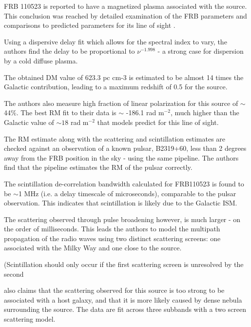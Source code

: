 \documentclass[a4paper,fleqn,usenatbib]{mnras}
\begin{document}
FRB 110523 is reported to have a magnetized plasma associated with the source. This conclusion was reached by detailed examination of the FRB parameters and comparisons to predicted parameters for its line of sight \cite{}.

Using a dispersive delay fit which allows for the spectral index to vary, the authors find the delay to be proportional to $\nu^{-1.998}$  - a strong case for dispersion by a cold diffuse plasma. 

The obtained DM value of 623.3 pc cm-3 is estimated to be almost 14 times the Galactic contribution, leading to a maximum redshift of 0.5 for the source.

The authors also measure high fraction of linear polarization for this source of $\sim$ 44\%. The best RM fit to their data is $\sim$ -186.1 rad m$^{-2}$, much higher than the Galactic value of $\sim 18$ rad m$^{-2}$ that models predict for this line of sight.

The RM estimate along with the scattering and scintillation estimates are checked against an observation of a known pulsar, B2319+60, less than 2 degrees away from the FRB position in the sky - using the same pipeline. The authors find that the pipeline estimates the RM of the pulsar correctly.

The scintillation de-correlation bandwidth calculated for FRB110523 is found to be $\sim$1 MHz (i.e. a delay timescale of microseconds), comparable to the pulsar observation. This indicates that scintillation is likely due to the Galactic ISM.  

The scattering observed through pulse broadening however, is much larger - on the order of milliseconds. This leads the authors to model the multipath propagation of the radio waves using two distinct scattering screens: one associated with the Milky Way and one close to the source. 

(Scintillation should only occur if the first scattering screen is unresolved by the second 

\citet{} also claims that the scattering observed for this source is too strong to be associated with a host galaxy, and that it is more likely caused by dense nebula surrounding the source. The data are fit across three subbands with a two screen scattering model.



\end{document}
